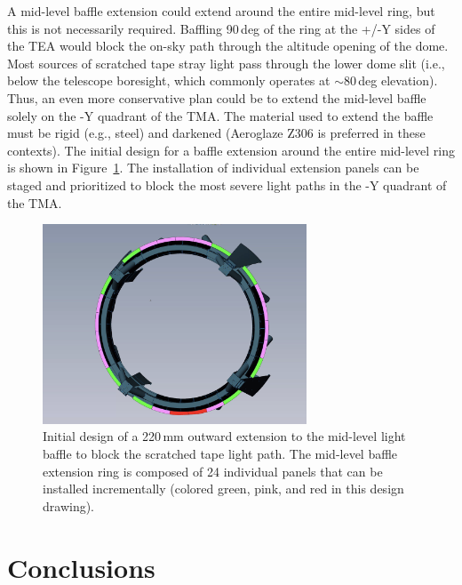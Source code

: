 \documentclass[SE,lsstdraft,authoryear,toc]{lsstdoc}
\begin{document}
A mid-level baffle extension could extend around the entire mid-level ring, but this is not necessarily required. Baffling 90\,deg of the ring at the +/-Y sides of the TEA would block the on-sky path through the altitude opening of the dome. Most sources of scratched tape stray light pass through the lower dome slit (i.e., below the telescope boresight, which commonly operates at $\sim$80\,deg elevation). Thus, an even more conservative plan could be to extend the mid-level baffle solely on the -Y quadrant of the TMA. The material used to extend the baffle must be rigid (e.g., steel) and darkened (Aeroglaze Z306 is preferred in these contexts). %
The initial design for a baffle extension around the entire mid-level ring is shown in Figure~\ref{fig:baffle}.
The installation of individual extension panels can be staged and prioritized to block the most severe light paths in the -Y quadrant of the TMA.

\begin{figure}[!t]
    \centering
    \includegraphics[width=0.7\textwidth, trim={2cm 0cm 0cm 0cm}, clip]{figures/baffle-ring.png}
    \caption{\label{fig:baffle} Initial design of a 220\,mm outward extension to the mid-level light baffle to block the scratched tape light path. The mid-level baffle extension ring is composed of 24 individual panels that can be installed incrementally (colored green, pink, and red in this design drawing).}
\end{figure}

\section{Conclusions}
\label{sec:conclusions}
\end{document}
